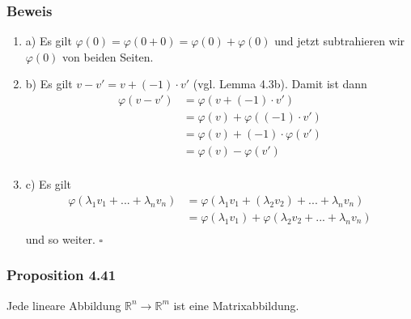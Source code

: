 \documentclass{article}
\begin{document}
\subsubsection*{Beweis}
\begin{enumerate}
    \item a) Es gilt $\varphi(0) = \varphi(0 + 0) = \varphi(0) + \varphi(0)$ und jetzt subtrahieren wir $\varphi(0)$ von beiden Seiten. \\
    \item b) Es gilt $v-v' = v + (-1) \cdot v'$ (vgl. Lemma 4.3b). Damit ist dann \\
    \begin{align*}
        \varphi(v-v') &= \varphi(v + (-1) \cdot v') \\
        &= \varphi(v) + \varphi((-1) \cdot v') \\
        &= \varphi(v) + (-1) \cdot \varphi(v') \\
        &= \varphi(v) - \varphi(v') \\
    \end{align*}
    \item c) Es gilt \\
    \begin{align*}
        \varphi(\lambda_1 v_1 + ... + \lambda_n v_n) &= \varphi(\lambda_1 v_1 +(\lambda_2 v_2) + ... + \lambda_n v_n) \\
        &= \varphi(\lambda_1 v_1) + \varphi(\lambda_2 v_2 + ... + \lambda_n v_n) \\
    \end{align*}
    und so weiter. $\square$ \\
\end{enumerate}

\subsubsection*{Proposition 4.41}
Jede lineare Abbildung $\mathbb{R}^n \rightarrow \mathbb{R}^m$ ist eine Matrixabbildung. \\
\\
\end{document}

